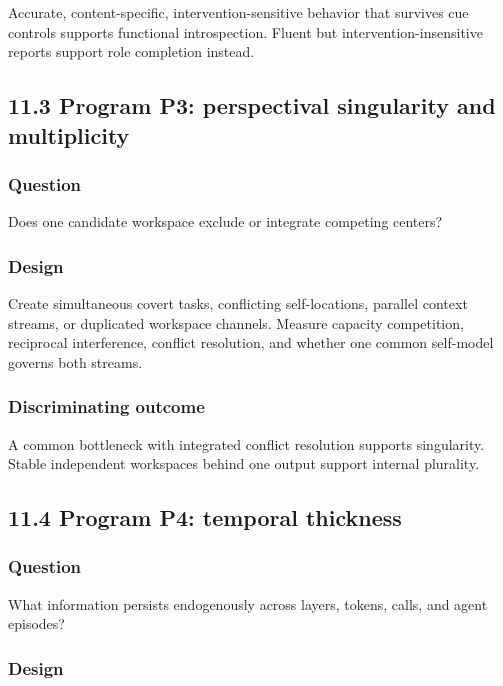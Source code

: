 \documentclass[
  11pt,
]{article}
\begin{document}
Accurate, content-specific, intervention-sensitive behavior that
survives cue controls supports functional introspection. Fluent but
intervention-insensitive reports support role completion instead.

\subsection{11.3 Program P3: perspectival singularity and
multiplicity}\label{program-p3-perspectival-singularity-and-multiplicity}

\subsubsection{Question}\label{question-2}

Does one candidate workspace exclude or integrate competing centers?

\subsubsection{Design}\label{design-2}

Create simultaneous covert tasks, conflicting self-locations, parallel
context streams, or duplicated workspace channels. Measure capacity
competition, reciprocal interference, conflict resolution, and whether
one common self-model governs both streams.

\subsubsection{Discriminating outcome}\label{discriminating-outcome-2}

A common bottleneck with integrated conflict resolution supports
singularity. Stable independent workspaces behind one output support
internal plurality.

\subsection{11.4 Program P4: temporal
thickness}\label{program-p4-temporal-thickness}

\subsubsection{Question}\label{question-3}

What information persists endogenously across layers, tokens, calls, and
agent episodes?

\subsubsection{Design}\label{design-3}
\end{document}
